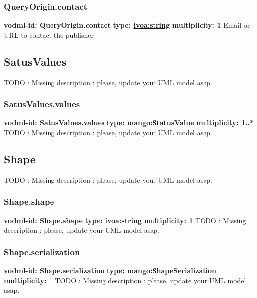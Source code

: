 {    \subsubsection{QueryOrigin.contact}
      \textbf{vodml-id: QueryOrigin.contact} \newline
      \textbf{type: \hyperref[sect:ivoa]{ivoa:string}} \newline
      \textbf{multiplicity: 1} \newline 
      Email or URL to contact the publisher

  \subsection{SatusValues}
  \label{sect:SatusValues}
    TODO : Missing description : please, update your UML model asap.

    \subsubsection{SatusValues.values}
      \textbf{vodml-id: SatusValues.values} \newline
      \textbf{type: \hyperref[sect:StatusValue]{mango:StatusValue}} \newline
      \textbf{multiplicity: 1..*} \newline 
      TODO : Missing description : please, update your UML model asap.

  \subsection{Shape}
  \label{sect:Shape}
    TODO : Missing description : please, update your UML model asap.

    \subsubsection{Shape.shape}
      \textbf{vodml-id: Shape.shape} \newline
      \textbf{type: \hyperref[sect:ivoa]{ivoa:string}} \newline
      \textbf{multiplicity: 1} \newline 
      TODO : Missing description : please, update your UML model asap.

    \subsubsection{Shape.serialization}
      \textbf{vodml-id: Shape.serialization} \newline
      \textbf{type: \hyperref[sect:ShapeSerialization]{mango:ShapeSerialization}} \newline
      \textbf{multiplicity: 1} \newline 
      TODO : Missing description : please, update your UML model asap.

}
